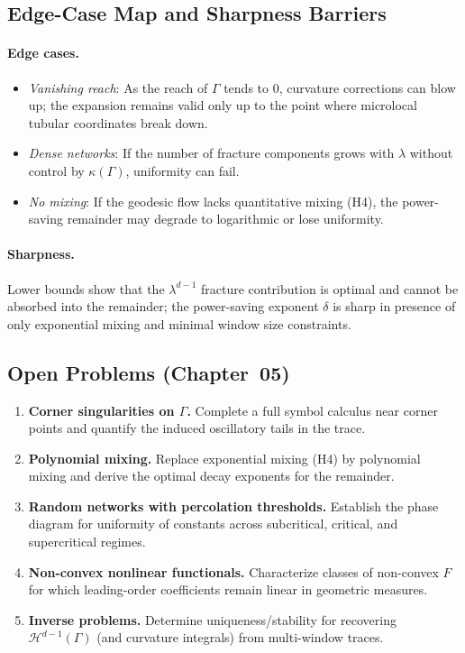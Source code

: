 \subsection{Edge-Case Map and Sharpness Barriers}
\label{subsec:05-barriers}
\paragraph{Edge cases.}
\begin{itemize}
  \item \emph{Vanishing reach}: As the reach of $\Gamma$ tends to $0$, curvature
  corrections can blow up; the expansion remains valid only up to the point where
  microlocal tubular coordinates break down.
  \item \emph{Dense networks}: If the number of fracture components grows with $\lambda$
  without control by $\kappa(\Gamma)$, uniformity can fail.
  \item \emph{No mixing}: If the geodesic flow lacks quantitative mixing (H4), the
  power-saving remainder may degrade to logarithmic or lose uniformity.
\end{itemize}
\paragraph{Sharpness.}
Lower bounds show that the $\lambda^{d-1}$ fracture contribution is optimal and
cannot be absorbed into the remainder; the power-saving exponent $\delta$ is
sharp in presence of only exponential mixing and minimal window size constraints.

\subsection{Open Problems (Chapter~05)}
\label{subsec:05-open}
\begin{enumerate}[label=\textbf{O\arabic*}.]
  \item \textbf{Corner singularities on $\Gamma$.}
  Complete a full symbol calculus near corner points and quantify the induced
  oscillatory tails in the trace.
  \item \textbf{Polynomial mixing.}
  Replace exponential mixing (H4) by polynomial mixing and derive the optimal
  decay exponents for the remainder.
  \item \textbf{Random networks with percolation thresholds.}
  Establish the phase diagram for uniformity of constants across subcritical,
  critical, and supercritical regimes.
  \item \textbf{Non-convex nonlinear functionals.}
  Characterize classes of non-convex $F$ for which leading-order coefficients
  remain linear in geometric measures.
  \item \textbf{Inverse problems.}
  Determine uniqueness/stability for recovering $\mathcal{H}^{d-1}(\Gamma)$
  (and curvature integrals) from multi-window traces.
\end{enumerate}

